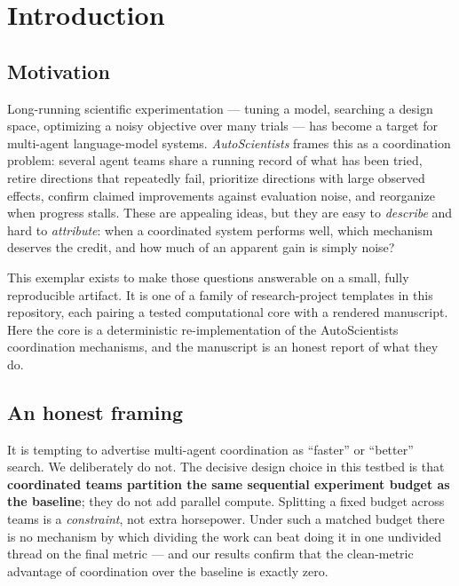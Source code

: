 \documentclass[
]{article}
\begin{document}
\newpage

\section{Introduction}\label{sec:introduction}

\subsection{Motivation}\label{motivation}

Long-running scientific experimentation --- tuning a model, searching a
design space, optimizing a noisy objective over many trials --- has
become a target for multi-agent language-model systems.
\emph{AutoScientists} \citep{gao2026autoscientists} frames this as a
coordination problem: several agent teams share a running record of what
has been tried, retire directions that repeatedly fail, prioritize
directions with large observed effects, confirm claimed improvements
against evaluation noise, and reorganize when progress stalls. These are
appealing ideas, but they are easy to \emph{describe} and hard to
\emph{attribute}: when a coordinated system performs well, which
mechanism deserves the credit, and how much of an apparent gain is
simply noise?

This exemplar exists to make those questions answerable on a small,
fully reproducible artifact. It is one of a family of research-project
templates in this repository, each pairing a tested computational core
with a rendered manuscript. Here the core is a deterministic
re-implementation of the AutoScientists coordination mechanisms, and the
manuscript is an honest report of what they do.

\subsection{An honest framing}\label{an-honest-framing}

It is tempting to advertise multi-agent coordination as ``faster'' or
``better'' search. We deliberately do not. The decisive design choice in
this testbed is that \textbf{coordinated teams partition the same
sequential experiment budget as the baseline}; they do not add parallel
compute. Splitting a fixed budget across teams is a \emph{constraint},
not extra horsepower. Under such a matched budget there is no mechanism
by which dividing the work can beat doing it in one undivided thread on
the final metric --- and our results confirm that the clean-metric
advantage of coordination over the baseline is exactly zero.
\end{document}
